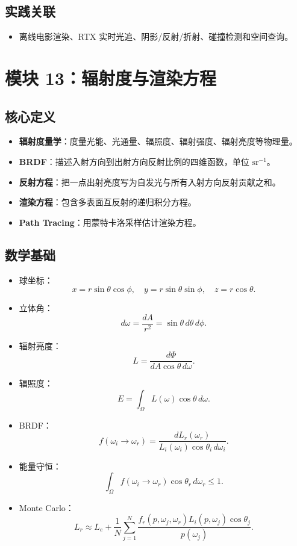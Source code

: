 \documentclass[UTF8,zihao=-4,scheme=chinese,fontset=fandol]{ctexart}
\newcommand{\key}[1]{\textbf{#1}}
\begin{document}
\subsection{实践关联}
\begin{itemize}
  \item 离线电影渲染、RTX 实时光追、阴影/反射/折射、碰撞检测和空间查询。
\end{itemize}

\section{模块 13：辐射度与渲染方程}

\subsection{核心定义}
\begin{itemize}
  \item \key{辐射度量学}：度量光能、光通量、辐照度、辐射强度、辐射亮度等物理量。
  \item \key{BRDF}：描述入射方向到出射方向反射比例的四维函数，单位 $\mathrm{sr}^{-1}$。
  \item \key{反射方程}：把一点出射亮度写为自发光与所有入射方向反射贡献之和。
  \item \key{渲染方程}：包含多表面互反射的递归积分方程。
  \item \key{Path Tracing}：用蒙特卡洛采样估计渲染方程。
\end{itemize}

\subsection{数学基础}
\begin{itemize}
  \item 球坐标：
  \[
  x=r\sin\theta\cos\phi,\quad y=r\sin\theta\sin\phi,\quad z=r\cos\theta.
  \]
  \item 立体角：
  \[
  d\omega=\frac{dA}{r^2}=\sin\theta\,d\theta\,d\phi.
  \]
  \item 辐射亮度：
  \[
  L=\frac{d\Phi}{dA\cos\theta\,d\omega}.
  \]
  \item 辐照度：
  \[
  E=\int_\Omega L(\omega)\cos\theta\,d\omega.
  \]
  \item BRDF：
  \[
  f(\omega_i\to\omega_r)=\frac{dL_r(\omega_r)}{L_i(\omega_i)\cos\theta_i\,d\omega_i}.
  \]
  \item 能量守恒：
  \[
  \int_\Omega f(\omega_i\to\omega_r)\cos\theta_r\,d\omega_r\le 1.
  \]
  \item Monte Carlo：
  \[
  L_r\approx L_e+\frac1N\sum_{j=1}^N
  \frac{f_r(p,\omega_j,\omega_r)L_i(p,\omega_j)\cos\theta_j}{p(\omega_j)}.
  \]
\end{itemize}
\end{document}
